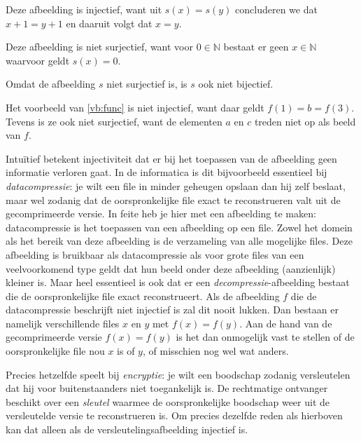 Deze afbeelding is injectief, want uit $s(x)=s(y)$ concluderen we dat $x+1=y+1$ en daaruit volgt dat $x=y$.

Deze afbeelding is niet surjectief, want voor $0\in\mathbb{N}$ bestaat er geen $x\in\mathbb{N}$ waarvoor geldt $s(x)=0$.

Omdat de afbeelding $s$ niet surjectief is, is $s$ ook niet bijectief.

Het voorbeeld van \ref{vb:func} is niet injectief, want daar geldt $f(1)=b=f(3)$. Tevens is ze ook niet surjectief, want de elementen $a$ en $c$ treden niet op als beeld van $f$.

Intu\"itief betekent injectiviteit dat er bij het toepassen van de afbeelding geen informatie verloren gaat. In de informatica is dit bijvoorbeeld essentieel bij \textit{datacompressie}: je wilt een file in minder geheugen opslaan dan hij zelf beslaat, maar wel zodanig dat de oorspronkelijke file exact te reconstrueren valt uit de gecomprimeerde versie. In feite heb je hier met een afbeelding te maken: datacompressie is het toepassen van een afbeelding op een file. Zowel het domein als het bereik van deze afbeelding is de verzameling van alle mogelijke files. Deze afbeelding is bruikbaar als datacompressie als voor grote files van een veelvoorkomend type geldt dat hun beeld onder deze afbeelding (aanzienlijk) kleiner is. Maar heel essentieel is ook dat er een \textit{decompressie}-afbeelding bestaat die de oorspronkelijke file exact reconstrueert. Als de afbeelding $f$ die de datacompressie beschrijft niet injectief is zal dit nooit lukken. Dan bestaan er namelijk verschillende files $x$ en $y$ met $f(x)=f(y)$. Aan de hand van de gecomprimeerde versie $f(x)=f(y)$ is het dan onmogelijk vast te stellen of de oorspronkelijke file nou $x$ is of $y$, of misschien nog wel wat anders.

Precies hetzelfde speelt bij \textit{encryptie}: je wilt een boodschap zodanig versleutelen dat hij voor buitenstaanders niet toegankelijk is. De rechtmatige ontvanger beschikt over een \textit{sleutel} waarmee de oorspronkelijke boodschap weer uit de versleutelde versie te reconstrueren is. Om precies dezelfde reden als hierboven kan dat alleen als de versleutelingsafbeelding injectief is. 

